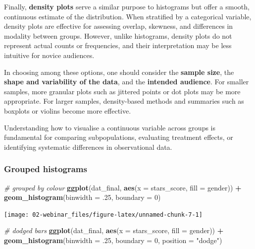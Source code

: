 \documentclass[
  oneside]{book}
\newenvironment{Shaded}{\begin{snugshade}}{\end{snugshade}}
\newcommand{\AttributeTok}[1]{\textcolor[rgb]{0.13,0.29,0.53}{#1}}
\newcommand{\CommentTok}[1]{\textcolor[rgb]{0.56,0.35,0.01}{\textit{#1}}}
\newcommand{\DecValTok}[1]{\textcolor[rgb]{0.00,0.00,0.81}{#1}}
\newcommand{\FunctionTok}[1]{\textcolor[rgb]{0.13,0.29,0.53}{\textbf{#1}}}
\newcommand{\NormalTok}[1]{#1}
\newcommand{\SpecialCharTok}[1]{\textcolor[rgb]{0.81,0.36,0.00}{\textbf{#1}}}
\newcommand{\StringTok}[1]{\textcolor[rgb]{0.31,0.60,0.02}{#1}}
\begin{document}
Finally, \textbf{density plots} serve a similar purpose to histograms but offer a smooth, continuous estimate of the distribution. When stratified by a categorical variable, density plots are effective for assessing overlap, skewness, and differences in modality between groups. However, unlike histograms, density plots do not represent actual counts or frequencies, and their interpretation may be less intuitive for novice audiences.

In choosing among these options, one should consider the \textbf{sample size}, the \textbf{shape and variability of the data}, and the \textbf{intended audience}. For smaller samples, more granular plots such as jittered points or dot plots may be more appropriate. For larger samples, density-based methods and summaries such as boxplots or violins become more effective.

Understanding how to visualise a continuous variable across groups is fundamental for comparing subpopulations, evaluating treatment effects, or identifying systematic differences in observational data.

\subsubsection{Grouped histograms}\label{grouped-histograms}

\begin{Shaded}
\begin{Highlighting}[]
\CommentTok{\# grouped by colour}
\FunctionTok{ggplot}\NormalTok{(dat\_final, }\FunctionTok{aes}\NormalTok{(}\AttributeTok{x =}\NormalTok{ stars\_score, }\AttributeTok{fill =}\NormalTok{ gender)) }\SpecialCharTok{+}
  \FunctionTok{geom\_histogram}\NormalTok{(}\AttributeTok{binwidth =}\NormalTok{ .}\DecValTok{25}\NormalTok{, }
                 \AttributeTok{boundary =} \DecValTok{0}\NormalTok{)}
\end{Highlighting}
\end{Shaded}

\begin{center}\texttt{[image: 02-webinar\_files/figure-latex/unnamed-chunk-7-1]} \end{center}

\begin{Shaded}
\begin{Highlighting}[]
\CommentTok{\# dodged bars}
\FunctionTok{ggplot}\NormalTok{(dat\_final, }\FunctionTok{aes}\NormalTok{(}\AttributeTok{x =}\NormalTok{ stars\_score, }\AttributeTok{fill =}\NormalTok{ gender)) }\SpecialCharTok{+}
  \FunctionTok{geom\_histogram}\NormalTok{(}\AttributeTok{binwidth =}\NormalTok{ .}\DecValTok{25}\NormalTok{, }
                 \AttributeTok{boundary =} \DecValTok{0}\NormalTok{,}
                 \AttributeTok{position =} \StringTok{"dodge"}\NormalTok{)}
\end{Highlighting}
\end{Shaded}
\end{document}
